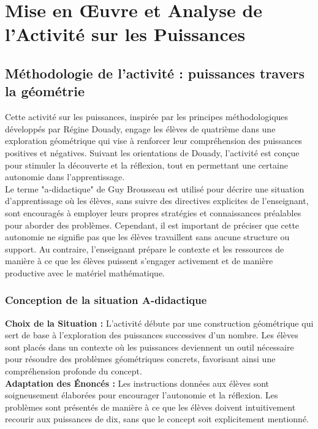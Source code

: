 \section{Mise en Œuvre et Analyse de l'Activité sur les Puissances}

\subsection{Méthodologie de l'activité : puissances travers la géométrie}

Cette activité sur les puissances,
inspirée par les principes méthodologiques développés par Régine Douady,
engage les élèves de quatrième dans une exploration géométrique qui vise à renforcer leur compréhension des puissances positives et négatives.
Suivant les orientations de Douady,
l'activité est conçue pour stimuler la découverte et la réflexion,
tout en permettant une certaine autonomie dans l'apprentissage.\\

Le terme "a-didactique" de Guy Brousseau \cite{brousseau} est utilisé pour décrire une situation d'apprentissage où les élèves,
sans suivre des directives explicites de l'enseignant,
sont encouragés à employer leurs propres stratégies et connaissances préalables pour aborder des problèmes.
Cependant,
il est important de préciser que cette autonomie ne signifie pas que les élèves travaillent sans aucune structure ou support.
Au contraire,
l'enseignant prépare le contexte et les ressources de manière à ce que les élèves puissent s'engager activement et de manière productive avec le matériel mathématique.

\subsubsection{Conception de la situation A-didactique}

\textbf{Choix de la Situation :}
L'activité débute par une construction géométrique qui sert de base à l'exploration des puissances successives d'un nombre.
Les élèves sont placés dans un contexte où les puissances deviennent un outil nécessaire pour résoudre des problèmes géométriques concrets,
favorisant ainsi une compréhension profonde du concept.\\

\textbf{Adaptation des Énoncés :}
Les instructions données aux élèves sont soigneusement élaborées pour encourager l'autonomie et la réflexion.
Les problèmes sont présentés de manière à ce que les élèves doivent intuitivement recourir aux puissances de dix,
sans que le concept soit explicitement mentionné.

